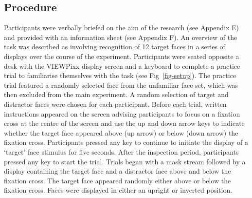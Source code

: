 \documentclass[
  10pt,
  letterpaper,
]{article}
\begin{document}
\subsection{Procedure}\label{procedure}

Participants were verbally briefed on the aim of the research (see
Appendix E) and provided with an information sheet (see Appendix F). An
overview of the task was described as involving recognition of 12 target
faces in a series of displays over the course of the experiment.
Participants were seated opposite a desk with the VIEWPixx display
screen and a keyboard to complete a practice trial to familiarise
themselves with the task (see Fig~\ref{fig-setup}). The practice trial
featured a randomly selected face from the unfamiliar face set, which
was then excluded from the main experiment. A random selection of target
and distractor faces were chosen for each participant. Before each
trial, written instructions appeared on the screen advising participants
to focus on a fixation cross at the centre of the screen and use the up
and down arrow keys to indicate whether the target face appeared above
(up arrow) or below (down arrow) the fixation cross. Participants
pressed any key to continue to initiate the display of a `target' face
stimulus for five seconds. After the inspection period, participants
pressed any key to start the trial. Trials began with a mask stream
followed by a display containing the target face and a distractor face
above and below the fixation cross. The target face appeared randomly
either above or below the fixation cross. Faces were displayed in either
an upright or inverted position.
\end{document}
